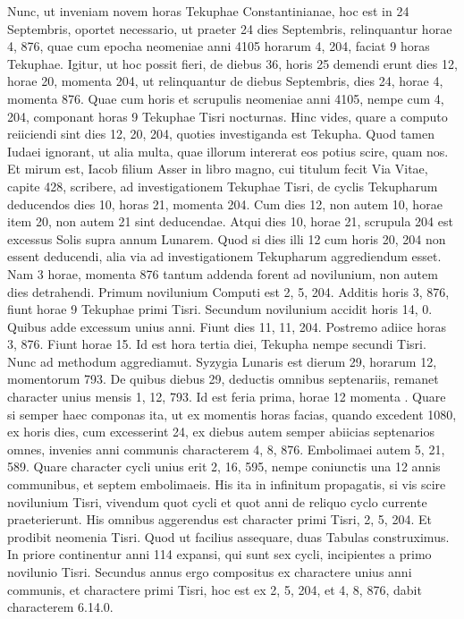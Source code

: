 Nunc, ut inveniam novem horas
Tekuphae Constantinianae, hoc est in 24 Septembris, oportet
necessario, ut praeter 24 dies Septembris, relinquantur horae 4,
876, quae cum epocha neomeniae anni 4105 horarum 4, 204, faciat
9 horas Tekuphae.
Igitur, ut hoc possit fieri, de diebus 36, horis 25
demendi erunt dies 12, horae 20, momenta 204, ut relinquantur
de diebus Septembris, dies 24, horae 4, momenta 876.
Quae cum
horis et scrupulis neomeniae anni 4105, nempe cum 4, 204, componant
horas 9 Tekuphae Tisri nocturnas.
Hinc vides, quare a computo
reiiciendi sint dies 12, 20, 204, quoties investiganda est Tekupha.
Quod tamen Iudaei ignorant, ut alia multa, quae illorum
intererat eos potius scire, quam nos.
Et mirum est, Iacob filium Asser
in libro magno, cui titulum fecit Via Vitae, capite 428, scribere, ad
investigationem Tekuphae Tisri, de cyclis Tekupharum deducendos
dies 10, horas 21, momenta 204.
Cum dies 12, non autem 10, horae
item 20, non autem 21 sint deducendae.
Atqui dies 10, horae 21, scrupula
204 est excessus Solis supra annum Lunarem.
Quod si dies illi 12
cum horis 20, 204 non essent deducendi, alia via ad investigationem
Tekupharum aggrediendum %
 esset.
Nam 3 horae, momenta 876 tantum
addenda forent ad novilunium, non autem dies detrahendi.
Primum
novilunium Computi est 2, 5, 204.
Additis horis 3, 876, fiunt horae 9
Tekuphae primi Tisri.
Secundum novilunium accidit horis 14, 0.
Quibus adde excessum unius anni.
Fiunt dies 11, 11, 204.
Postremo
adiice horas 3, 876.
Fiunt horae 15.
Id est hora tertia diei, Tekupha
nempe secundi Tisri.
Nunc ad methodum aggrediamut.
Syzygia
Lunaris est dierum 29, horarum 12, momentorum 793.
De quibus
diebus 29, deductis omnibus septenariis, remanet character unius
mensis 1, 12, 793.
Id est feria prima, horae 12 momenta .
Quare si
semper haec componas ita, ut ex momentis horas facias, quando excedent
1080, ex horis dies, cum excesserint 24, ex diebus autem semper
abiicias septenarios omnes, invenies anni communis characterem 4, 8,
876.
Embolimaei %
 autem 5, 21, 589.
Quare character cycli unius erit 2,
16, 595, nempe coniunctis una 12 annis communibus, et septem embolimaeis.
His ita in infinitum propagatis, si vis scire novilunium Tisri,
vivendum quot cycli et quot anni de reliquo cyclo currente praeterierunt.
His omnibus aggerendus est character primi Tisri, 2, 5, 204.
Et prodibit neomenia Tisri.
Quod ut facilius assequare, duas Tabulas
construximus.
In priore continentur anni 114 expansi, qui
sunt sex cycli, incipientes a primo novilunio Tisri.
Secundus annus
ergo compositus ex charactere unius anni communis, et charactere
primi Tisri, hoc est ex 2, 5, 204, et 4, 8, 876, dabit characterem
6.14.0.

